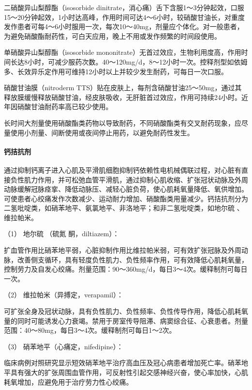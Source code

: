 二硝酸异山梨醇酯（isosorbide
dinitrate，消心痛）舌下含服1～3分钟起效，口服15～20分钟起效，1小时达高峰，作用时间可达4～6小时，较硝酸甘油长，对重度发作患者可每4～6小时服用一次，每次10～40mg，剂量应个体化。对一般患者，为避免硝酸酯耐药性，可白天应用，晚上不用或发作频繁的时间段使用。

单硝酸异山梨醇酯（isosorbide
mononitrate）无首过效应，生物利用度高，作用时间长达8小时，可减少服药次数。40～120mg/d，8～12小时一次。控释剂型如依姆多、长效异乐定作用可维持12小时以上并较少发生耐药，可每日一次口服。

硝酸甘油膜（nitroderm
TTS）贴在皮肤上，每剂含硝酸甘油25～50mg，通过其释放膜缓慢释放硝酸甘油，经皮肤吸收，无肝脏首过效应，作用可持续24小时。近年因硝酸甘油耐药率高已较少使用。

长时间大剂量使用硝酸酯类药物以导致耐药，不同硝酸酯类有交叉耐药现象，应尽量使用小剂量、间断使用或夜间停止用药，以避免耐药性发生。

\paragraph{钙拮抗剂}

通过抑制钙离子进入心肌及平滑肌细胞抑制钙依赖性电机械偶联过程，对心脏有直接负性肌力作用，并可松弛血管平滑肌，通过抑制心肌收缩、扩张冠状动脉及外周动脉缓解冠脉痉挛、降低动脉压、减轻心脏负荷，使心肌耗氧量降低、氧供增加。可使患者心绞痛发作次数减少、运动耐力增加、硝酸酯类用量减少。钙拮抗剂分为二氢吡啶类，如硝苯地平、氨氯地平、非洛地平；和非二氢吡啶类，如地尔硫{}
、维拉帕米。

\hypertarget{text00309.htmlux5cux23CHP10-7-3-1-2-5-1}{}
（1） 地尔硫{} （硫氮{} 酮，diltiazem）：

扩血管作用比硝苯地平弱，心脏抑制作用比维拉帕米弱，可有效扩张冠脉及外周动脉，改善侧支循环，具有轻度负性肌力、负性频率作用，可有效降低心肌耗氧量，控制劳力及自发心绞痛。剂量范围：90～360mg/d，每日3～4次。缓释制剂可每日一次。

\hypertarget{text00309.htmlux5cux23CHP10-7-3-1-2-5-2}{}
（2） 维拉帕米（异搏定，verapamil）：

可扩张全身及冠状动脉，具有负性肌力、负性频率、负性传导作用，降低心肌耗氧量的同时可能诱发心力衰竭。禁用于房室传导阻滞、病窦综合征、心衰患者。剂量范围：40～80mg，每日3～4次。缓释制剂可每日1～2次。

\hypertarget{text00309.htmlux5cux23CHP10-7-3-1-2-5-3}{}
（3） 硝苯地平（心痛定，nifedipine）：

临床病例对照研究显示短效硝苯地平治疗高血压及冠心病患者增加死亡率。硝苯地平具有强大的扩张周围血管作用，可反射性引起交感神经兴奋，使心率加快，心肌耗氧增加，应避免用于治疗劳力性心绞痛。


